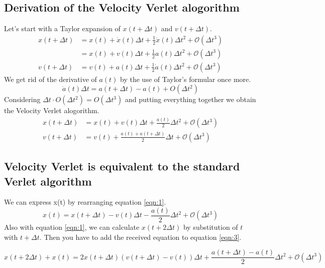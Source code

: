 \documentclass[12pt,a4paper]{scrartcl}
\begin{document}
\subsection{Derivation of the Velocity Verlet alogorithm}
Let's start with a Taylor expansion of $x(t + \Delta t)$ and $v(t + \Delta t)$.
\begin{align}
x(t + \Delta t) &= x(t) + \dot{x}(t) \Delta t + \frac{1}{2} \ddot{x}(t) \Delta t ^2 + \mathcal O(\Delta t ^3) \\
&= x(t) + v(t) \Delta t + \frac{1}{2} a(t) \Delta t ^2 + \mathcal O(\Delta t ^3) \\
v(t + \Delta t) &= v(t) + a(t) \Delta t + \frac{1}{2} \dot{a}(t) \Delta t ^2 + \mathcal O(\Delta t ^3)
\end{align}
We get rid of the derivative of $a(t)$ by the use of Taylor's formular once more.
\begin{equation}
\dot{a}(t) \Delta t = a(t+\Delta t) - a(t) + O(\Delta t ^2)
\end{equation}
Considering $\Delta t \cdot O(\Delta t ^2) = O(\Delta t ^3)$ and putting everything together we obtain the Velocity Verlet alogorithm.
\begin{align}
x(t + \Delta t) &= x(t) + v(t) \Delta t + \frac{a(t)}{2} \Delta t ^2 + \mathcal O(\Delta t ^3) \label{eqn:1}\\
v(t + \Delta t) &= v(t) + \frac{a(t)+a(t+\Delta t)}{2} \Delta t + \mathcal O(\Delta t ^3)
\label{eqn:2}
\end{align}

\subsection{Velocity Verlet is equivalent to the standard Verlet algorithm}
We can express x(t) by rearranging equation \ref{eqn:1}.
\begin{equation}
x(t) = x(t + \Delta t) - v(t) \Delta t - \frac{a(t)}{2} \Delta t ^2 + \mathcal O(\Delta t ^3)
\label{eqn:3}
\end{equation}
Also with equation \ref{eqn:1}, we can calculate $x(t+2\Delta t)$ by substitution of $t$ with $t + \Delta t$. Then you have to add the received equation to equation \ref{eqn:3}.

\begin{equation}
x(t + 2 \Delta t) + x(t) = 2 x(t + \Delta t) \left( v(t+\Delta t)- v(t) \right) \Delta t + \frac{a(t+\Delta t)-a(t)}{2} \Delta t ^2 + \mathcal O(\Delta t ^3)
\end{equation}
\end{document}
